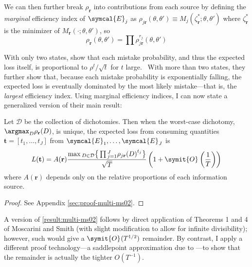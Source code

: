 \documentclass{fancyArticle}
\providecommand{\E}{\symcal{E}}             %
\renewcommand{\|}{\,|\,}                    %
\providecommand{\;}{\,;}                    %
\renewcommand{\O}{\symit{O}\:\!}            %
\begin{document}
We can then further break $\rho_{\mathbf{r}}$ into contributions from each source by defining the \textit{marginal} efficiency index of $\E_j$ as $\rho_{j \mathbf{r}}(\theta,\theta')\equiv M_j(\zeta^{*}_{\mathbf{r}};\theta,\theta')$ where $\zeta^{*}_{\mathbf{r}}$ is the minimizer of $M_{\mathbf{r}}(\cdot;\theta,\theta')$, so
\begin{equation*}
  \label{eq:marginal-efficiency indices}
  \rho_{\mathbf{r}}(\theta,\theta')=\prod\rho_{j \mathbf{r}}^{r_j}(\theta,\theta')
\end{equation*}

With only two states, \cite{Moscarini2002} show that each mistake probability, and thus the expected loss itself, is proportional to $\rho^{t}/\sqrt{t}$ for $t$ large.\footnotemark\
With more than two states, they further show that, because each mistake probability is exponentially falling, the expected loss is eventually dominated by the most likely mistake---that is, the \textit{largest} efficiency index.
Using marginal efficiency indices, I can now state a generalized version of their main result:

\setcounter{prop}{-1}
\begin{proposition}
  \label{result:multi-ms02}
  Let $\mathcal{D}$ be the collection of dichotomies.
  Then when the worst-case dichotomy, $\argmax_{D}\rho_{\mathbf{r}}(D)$, is unique, the expected loss from consuming quantities $\mathbf{t}=[t_{1},\ldots,t_J]$ from $\E_{1},\ldots,\E_{J}$ is\footnotemark
  \begin{equation}
    \label{eq:multi-fig}
    L(\mathbf{t}) = A(\mathbf{r}) \frac{\max\textstyle_{D\in \mathcal{D}}
      \big\{\prod\textstyle_{j=1}^J \rho_{j\mathbf{r}}{(D)}^{t_j}\big\}}
    {\sqrt{T}}
    \left( 1 + \O\left( \frac{1}{T} \right) \right)
  \end{equation}
  where $A(\mathbf{r})$ depends only on the relative proportions of each information source.
\end{proposition}
\begin{proof}
  See Appendix \ref{sec:proof-multi-ms02}.
  \renewcommand{\qedsymbol}{}
\end{proof}

A version of \autoref{result:multi-ms02} follows by direct application of Theorems 1 and 4 of Moscarini and Smith (with slight modification to allow for infinite divisibility); however, such would give a $\O(T^{1/2})$ remainder.
By contrast, I apply a different proof technology---a saddlepoint approximation due to \cite{Lugannani1980}---to show that the remainder is actually the tighter $O(T^{-1})$.
\end{document}
